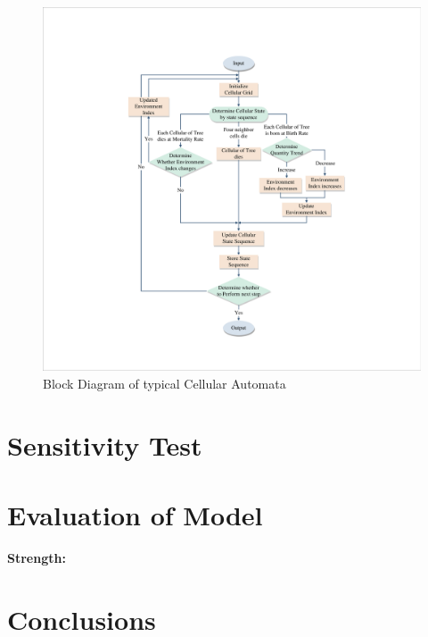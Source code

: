 \documentclass{mcmthesis}
\numberwithin{figure}{section}
\numberwithin{table}{section}
\numberwithin{equation}{section}
\begin{document}
\begin{figure}[htbp]
  \centering
  \includegraphics[width = 12cm]{code&pic/元胞自动机流程图.pdf}
  \caption{Block Diagram of typical Cellular Automata}\label{CA_Fig}
\end{figure}






\section{Sensitivity Test}

\section{Evaluation of Model}

\textbf{Strength:}


\section{Conclusions}



\newpage
{}
\memodate{\today}

\begin{memo}

  
\end{memo}
\end{document}
